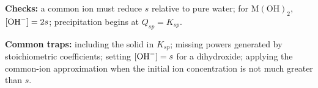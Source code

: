 \textbf{Checks:} a common ion must reduce \(s\) relative to pure water; for \(\mathrm{M(OH)_2}\), \([\ce{OH-}]=2s\); precipitation begins at \(Q_{sp}=K_{sp}\).

\textbf{Common traps:} including the solid in \(K_{sp}\); missing powers generated by stoichiometric coefficients; setting \([\ce{OH-}]=s\) for a dihydroxide; applying the common-ion approximation when the initial ion concentration is not much greater than \(s\).
